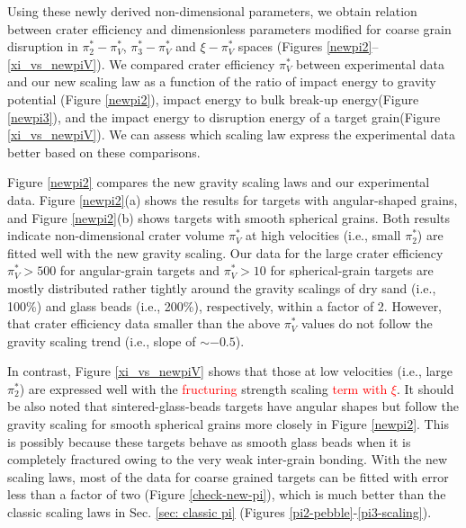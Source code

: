 \documentclass[3p,authoryear]{elsarticle}
\newcommand{\red}[1]{\textcolor{red}{#1}}
\begin{document}
Using these newly derived non-dimensional parameters, we obtain relation between crater efficiency and dimensionless parameters modified for coarse grain disruption in $\pi_2^*-\pi_V^*$, $\pi_3^*-\pi_V^*$ and $\xi - \pi_V^*$ spaces (Figures \ref{newpi2}--\ref{xi_vs_newpiV}).
We compared crater efficiency $\pi_V^*$ between experimental data and our new scaling law as a function of the ratio of impact energy to gravity potential (Figure \ref{newpi2}), impact energy to bulk break-up energy(Figure \ref{newpi3}), and the impact energy to disruption energy of a target grain(Figure \ref{xi_vs_newpiV}).
We can assess which scaling law express the experimental data better based on these comparisons.

Figure \ref{newpi2} compares the new gravity scaling laws and our experimental data. Figure \ref{newpi2}(a) shows the results for targets with angular-shaped grains, and Figure \ref{newpi2}(b) shows targets with smooth spherical grains.
Both results indicate non-dimensional crater volume $\pi_V^*$ at high velocities (i.e., small $\pi_2^*$) are fitted well with the new gravity scaling.
Our data for the large crater efficiency $\pi_V^*> 500$ for angular-grain targets and $\pi_V^*>10$ for spherical-grain targets are mostly distributed rather tightly around the gravity scalings of dry sand (i.e., 100\%) and glass beads (i.e., 200\%), respectively, within a factor of 2.
However, that crater efficiency data smaller than the above $\pi_V^*$ values do not follow the gravity scaling trend (i.e., slope of $\sim -0.5$).

In contrast, Figure \ref{xi_vs_newpiV} shows that those at low velocities (i.e., large $\pi_2^*$) are expressed well with the \red{fructuring} strength scaling \red{term with $\xi$}.
It should be also noted that sintered-glass-beads targets have angular shapes but follow the gravity scaling for smooth spherical grains more closely in Figure \ref{newpi2}.
This is possibly because these targets behave as smooth glass beads when it is completely fractured owing to the very weak inter-grain bonding.
With the new scaling laws, most of the data for coarse grained targets can be fitted with error less than a factor of two (Figure \ref{check-new-pi}), which is much better than the classic scaling laws in Sec. \ref{sec: classic pi} (Figures \ref{pi2-pebble}-\ref{pi3-scaling}).
\end{document}

